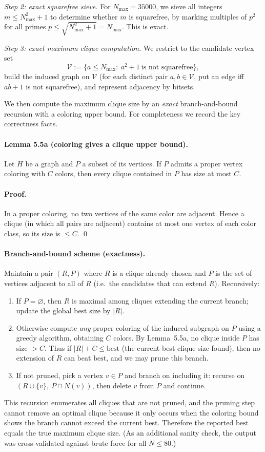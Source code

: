 \emph{Step 2: exact squarefree sieve.}
For $N_{\max}=35000$, we sieve all integers $m\le N_{\max}^2+1$ to determine whether $m$ is squarefree, by marking multiples of $p^2$ for all primes $p\le \sqrt{N_{\max}^2+1}=N_{\max}$.
This is exact.

\emph{Step 3: exact maximum clique computation.}
We restrict to the candidate vertex set
\[
\mathcal V:=\{a\le N_{\max}:\ a^2+1\ \text{is not squarefree}\},
\]
build the induced graph on $\mathcal V$ (for each distinct pair $a,b\in\mathcal V$, put an edge iff $ab+1$ is not squarefree),
and represent adjacency by bitsets.

We then compute the maximum clique size by an \emph{exact} branch-and-bound recursion with a coloring upper bound.
For completeness we record the key correctness facts.

\paragraph{Lemma 5.5a (coloring gives a clique upper bound).}
Let $H$ be a graph and $P$ a subset of its vertices.
If $P$ admits a proper vertex coloring with $C$ colors, then every clique contained in $P$ has size at most $C$.

\paragraph{Proof.}
In a proper coloring, no two vertices of the same color are adjacent.
Hence a clique (in which all pairs are adjacent) contains at most one vertex of each color class, so its size is $\le C$.
\qed

\paragraph{Branch-and-bound scheme (exactness).}
Maintain a pair $(R,P)$ where $R$ is a clique already chosen and $P$ is the set of vertices adjacent to all of $R$
(i.e.\ the candidates that can extend $R$).
Recursively:
\begin{enumerate}
\item If $P=\varnothing$, then $R$ is maximal among cliques extending the current branch; update the global best size by $|R|$.
\item Otherwise compute \emph{any} proper coloring of the induced subgraph on $P$ using a greedy algorithm, obtaining $C$ colors.
By Lemma~5.5a, no clique inside $P$ has size $>C$.
Thus if $|R|+C\le \mathrm{best}$ (the current best clique size found), then no extension of $R$ can beat $\mathrm{best}$, and we may prune this branch.
\item If not pruned, pick a vertex $v\in P$ and branch on including it:
recurse on $(R\cup\{v\},\ P\cap N(v))$, then delete $v$ from $P$ and continue.
\end{enumerate}
This recursion enumerates all cliques that are not pruned, and the pruning step cannot remove an optimal clique because it only occurs when the coloring bound shows the branch cannot exceed the current best.
Therefore the reported $\mathrm{best}$ equals the true maximum clique size.
(As an additional sanity check, the output was cross-validated against brute force for all $N\le 80$.)


